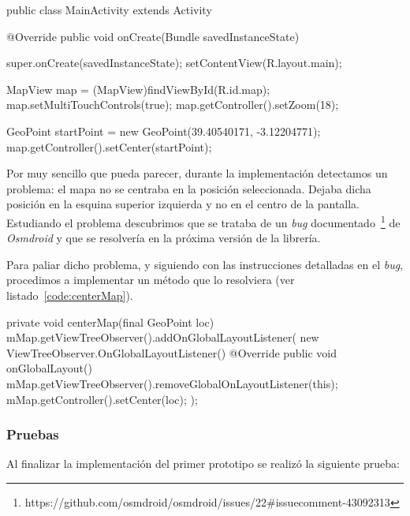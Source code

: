 \begin{listing}[
  float=ht,
  language = java,
  caption  = {Ejemplo de \texttt{activity} mostrando un punto de un mapa en específico},
  label    = code:activityMapView]
public class MainActivity extends Activity {
    @Override
    public void onCreate(Bundle savedInstanceState) {
        super.onCreate(savedInstanceState);
        setContentView(R.layout.main);

        MapView map = (MapView)findViewById(R.id.map);
        map.setMultiTouchControls(true);
        map.getController().setZoom(18);

        GeoPoint startPoint = new GeoPoint(39.40540171, -3.12204771);
        map.getController().setCenter(startPoint);
    }
}
\end{listing}

Por muy sencillo que pueda parecer, durante la implementación detectamos un problema: el mapa no se
centraba en la posición seleccionada. Dejaba dicha posición en la esquina superior izquierda y no en
el centro de la pantalla. Estudiando el problema descubrimos que se trataba de un \emph{bug}
documentado~\footnote{https://github.com/osmdroid/osmdroid/issues/22\#issuecomment-43092313} de
\emph{Osmdroid} y que se resolvería en la próxima versión de la librería.

Para paliar dicho problema, y siguiendo con las instrucciones detalladas en el \emph{bug},
procedimos a implementar un método que lo resolviera (ver listado~\ref{code:centerMap}).

\begin{listing}[
  float=ht,
  language = java,
  caption  = {Método utilizado para centrar el mapa en cualquier posición},
  label    = code:centerMap]
private void centerMap(final GeoPoint loc) {
    mMap.getViewTreeObserver().addOnGlobalLayoutListener(
            new ViewTreeObserver.OnGlobalLayoutListener() {
        @Override
        public void onGlobalLayout() {
            mMap.getViewTreeObserver().removeGlobalOnLayoutListener(this);
            mMap.getController().setCenter(loc);
        }
    });
}
\end{listing}

\subsubsection{Pruebas}

Al finalizar la implementación del primer prototipo se realizó la siguiente prueba:

